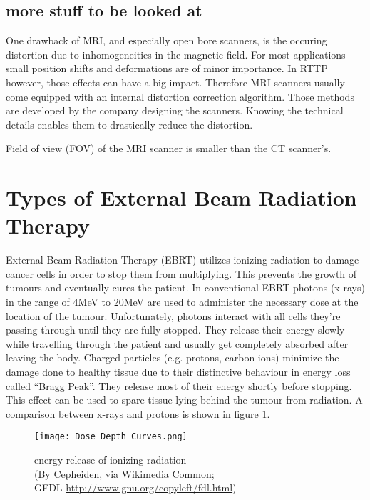 \subsection{more stuff to be looked at}
One drawback of MRI, and especially open bore scanners, is the occuring distortion due to inhomogeneities in the magnetic field.
For most applications small position shifts and deformations are of minor importance.
In RTTP however, those effects can have a big impact.
Therefore MRI scanners usually come equipped with an internal distortion correction algorithm.
Those methods are developed by the company designing the scanners. Knowing the technical details enables them to drastically reduce the distortion.

Field of view (FOV) of the MRI scanner is smaller than the CT scanner's.

\section{Types of External Beam Radiation Therapy}
\label{sec:planning}
External Beam Radiation Therapy (EBRT) utilizes ionizing radiation to damage cancer cells in order to stop them from multiplying.
This prevents the growth of tumours and eventually cures the patient. 
In conventional EBRT photons (x-rays) in the range of 4MeV to 20MeV are used to administer the necessary dose at the location of the tumour. Unfortunately, photons interact with all cells
they're passing through until they are fully stopped. They release their energy slowly while travelling through the patient and usually get completely absorbed after leaving the body.
Charged particles (e.g. protons, carbon ions) minimize the damage done to healthy tissue due to their distinctive behaviour in energy loss called ``Bragg Peak''.
They release most of their energy shortly before stopping. \cite{Nakamura2010} This effect can be used to spare tissue lying behind the tumour from radiation. \cite{Paganetti2005} %
A comparison between x-rays and protons is shown in figure \ref{fig:bragg}.

\begin{figure}[!h]
	\centering
	\texttt{[image: Dose\_Depth\_Curves.png]}
	\caption{energy release of ionizing radiation \\(By Cepheiden, via Wikimedia Common;\\ GFDL \url{http://www.gnu.org/copyleft/fdl.html})}
	\label{fig:bragg}
\end{figure}


